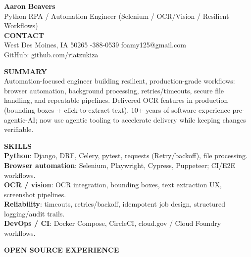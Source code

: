 \documentclass[10pt]{article}
\begin{document}
{\LARGE \textbf{Aaron Beavers}}\\
Python RPA / Automation Engineer (Selenium / OCR/Vision / Resilient Workflows)\\

\vspace{2pt}
\textbf{CONTACT}\\
West Des Moines, IA 50265 \;\;\textbar\;-388-0539 \;\;\textbar\;\; foamy125@gmail.com\\
GitHub: github.com/riatzukiza

\vspace{6pt}
\textbf{SUMMARY}\\
Automation-focused engineer building resilient, production-grade workflows: browser automation, background processing, retries/timeouts, secure file handling, and repeatable pipelines. Delivered OCR features in production (bounding boxes + click-to-extract text). 10+ years of software experience pre-agentic-AI; now use agentic tooling to accelerate delivery while keeping changes verifiable.

\vspace{2pt}
\textbf{SKILLS}\\
\textbf{Python}: Django, DRF, Celery, pytest, requests (Retry/backoff), file processing.\\
\textbf{Browser automation}: Selenium, Playwright, Cypress, Puppeteer; CI/E2E workflows.\\
\textbf{OCR / vision}: OCR integration, bounding boxes, text extraction UX, screenshot pipelines.\\
\textbf{Reliability}: timeouts, retries/backoff, idempotent job design, structured logging/audit trails.\\
\textbf{DevOps / CI}: Docker Compose, CircleCI, cloud.gov / Cloud Foundry workflows.

\vspace{6pt}
\textbf{OPEN SOURCE EXPERIENCE}\\
\end{document}
